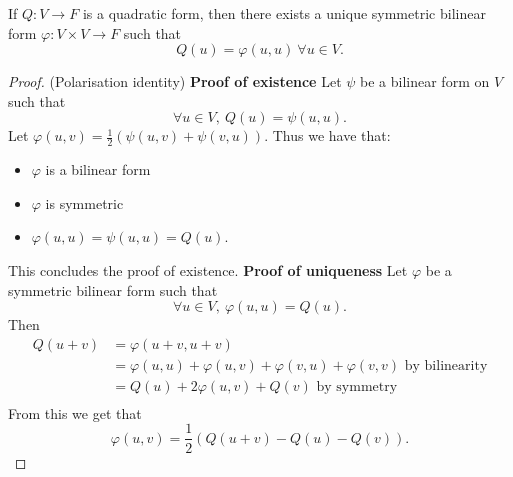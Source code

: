 \documentclass[egregdoesnotlikesansseriftitles,a4paper]{scrartcl}
\begin{document}
\begin{proposition}
     If $Q: V \rightarrow F$ is a quadratic form, then there exists a unique symmetric bilinear form $\varphi: V \times V \rightarrow F $ such that 
     \[Q(u)=\varphi (u,u) \ \forall u \in V.\]
\end{proposition}
\begin{proof}(Polarisation identity)\newline 
     \textbf{Proof of existence}\newline 
     Let $\psi$ be a bilinear form on $V$ such that 
     \[\forall u \in V, \ Q(u)=\psi (u,u).\]
     Let $\varphi (u,v)=\frac{1}{2} (\psi (u,v)+ \psi (v,u))$. Thus we have that:
     \begin{itemize}
         \item $\varphi$ is a bilinear form
         \item $\varphi$ is symmetric
         \item $\varphi (u,u)=\psi (u,u)=Q (u)$.
     \end{itemize}
     This concludes the proof of existence.\newline 
     \textbf{Proof of uniqueness}\newline 
     Let $\varphi$ be a symmetric bilinear form such that 
     \[\forall u \in V, \ \varphi (u,u)=Q(u).\]
     Then 
     \begin{equation*}
          \begin{split}
            Q (u+v)&=\varphi (u+v,u+v)\\
            &=\varphi (u,u)+ \varphi (u,v)+\varphi (v,u)+ \varphi (v,v) \text{ by bilinearity} \\
            &=Q(u)+ 2\varphi (u,v)+Q(v) \text{ by symmetry}\\
          \end{split}
     \end{equation*}
     From this we get that 
     \[\varphi(u,v)=\frac{1}{2} (Q (u+v)-Q (u)- Q (v)).\]
\end{proof}
\end{document}
